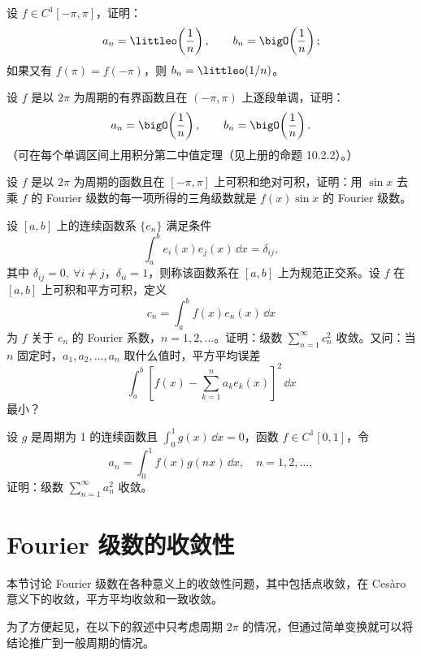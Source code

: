 \begin{xexercise}[4]
设 $f\in C^1[-\pi,\pi]$，证明：
  \[
    a_n=\littleo\!\left(\frac1n\right),\qquad b_n=\bigO\!\left(\frac1n\right);
  \]
  如果又有 $f(\pi)=f(-\pi)$，则 $b_n=\littleo(1/n)$。
\end{xexercise}

\begin{xexercise}[5]
设 $f$ 是以 $2\pi$ 为周期的有界函数且在 $(-\pi,\pi)$ 上逐段单调，证明：
  \[
    a_n=\bigO\!\left(\frac1n\right),\qquad b_n=\bigO\!\left(\frac1n\right).
  \]
  （可在每个单调区间上用积分第二中值定理（见上册的命题 10.2.2）。）
\end{xexercise}

\begin{xexercise}[6]
设 $f$ 是以 $2\pi$ 为周期的函数且在 $[-\pi,\pi]$ 上可积和绝对可积，证明：用 $\sin x$ 去乘 $f$ 的 Fourier 级数的每一项所得的三角级数就是 $f(x)\sin x$ 的 Fourier 级数。
\end{xexercise}

\begin{xexercise}[7]
设 $[a,b]$ 上的连续函数系 $\{e_n\}$ 满足条件
  \[
    \int_a^b e_i(x)e_j(x)\,\dd x=\delta_{ij},
  \]
  其中 $\delta_{ij}=0,\ \forall i\ne j$，$\delta_{ii}=1$，则称该函数系在 $[a,b]$ 上为规范正交系。设 $f$ 在 $[a,b]$ 上可积和平方可积，定义
  \[
    c_n=\int_a^b f(x)e_n(x)\,\dd x
  \]
  为 $f$ 关于 $e_n$ 的 Fourier 系数，$n=1,2,\ldots$。证明：级数 $\sum_{n=1}^{\infty}c_n^2$ 收敛。又问：当 $n$ 固定时，$a_1,a_2,\ldots,a_n$ 取什么值时，平方平均误差
  \[
    \int_a^b\left[f(x)-\sum_{k=1}^{n}a_ke_k(x)\right]^2\,\dd x
  \]
  最小？
\end{xexercise}

\begin{xexercise}[8]
设 $g$ 是周期为 1 的连续函数且 $\int_0^1g(x)\,\dd x=0$，函数 $f\in C^1[0,1]$，令
  \[
    a_n=\int_0^1f(x)g(nx)\,\dd x,\quad n=1,2,\ldots,
  \]
  证明：级数 $\sum_{n=1}^{\infty}a_n^2$ 收敛。
\end{xexercise}

\section{Fourier 级数的收敛性}

本节讨论 Fourier 级数在各种意义上的收敛性问题，其中包括点收敛，在 Cesàro 意义下的收敛，平方平均收敛和一致收敛。

为了方便起见，在以下的叙述中只考虑周期 $2\pi$ 的情况，但通过简单变换就可以将结论推广到一般周期的情况。

